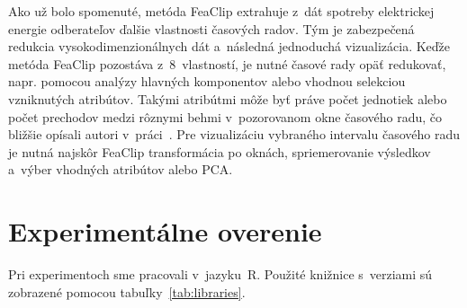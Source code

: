 \documentclass[a4paper,twoside,slovak,12pt,appendix]{article}
\begin{document}
Ako už bolo spomenuté, metóda FeaClip extrahuje z~dát spotreby elektrickej
energie odberateľov ďalšie vlastnosti časových radov. Tým je zabezpečená
redukcia vysokodimenzionálnych dát a~následná jednoduchá vizualizácia. Keďže
metóda FeaClip pozostáva z~8~vlastností, je nutné časové rady opäť redukovať,
napr. pomocou analýzy hlavných komponentov alebo vhodnou selekciou vzniknutých
atribútov. Takými atribútmi môže byť práve počet jednotiek alebo počet prechodov
medzi rôznymi behmi v~pozorovanom okne časového radu, čo bližšie opísali autori
v~práci~\cite{Laurinec2018}. Pre vizualizáciu vybraného intervalu časového radu
je nutná najskôr FeaClip transformácia po oknách, spriemerovanie výsledkov
a~výber vhodných atribútov alebo PCA.


\newpage
\section{Experimentálne overenie}
Pri experimentoch sme pracovali v~jazyku~R. Použité knižnice s~verziami sú
zobrazené pomocou tabuľky~\ref{tab:libraries}.
\end{document}
